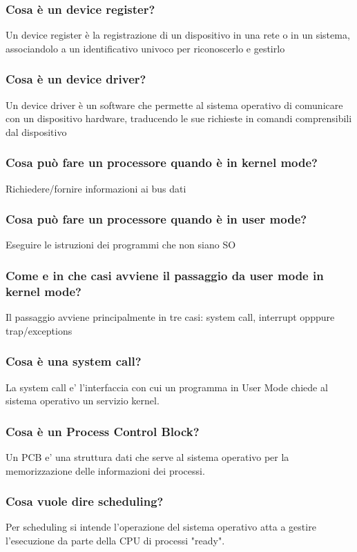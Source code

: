 \documentclass{article}
\begin{document}
\subsubsection{Cosa è un device register?}
Un device register è la registrazione di un dispositivo in una rete o in un
sistema, associandolo a un identificativo univoco per riconoscerlo e gestirlo
\subsubsection{Cosa è un device driver?}
Un device driver è un software che permette al sistema operativo di comunicare
con un dispositivo hardware, traducendo le sue richieste in comandi
comprensibili dal dispositivo
\subsubsection{Cosa può fare un processore quando è in kernel mode?}
Richiedere/fornire informazioni ai bus dati
\subsubsection{Cosa può fare un processore quando è in user mode?}
Eseguire le istruzioni dei programmi che non siano SO
\subsubsection{Come e in che casi avviene il passaggio da user mode in kernel mode?}
Il passaggio avviene principalmente in tre casi: system call, interrupt opppure
trap/exceptions
\subsubsection{Cosa è una system call?}
La system call e' l'interfaccia con cui un programma in User Mode chiede al
sistema operativo un servizio kernel.
\subsubsection{Cosa è un Process Control Block?}
Un PCB e' una struttura dati che serve al sistema operativo per la
memorizzazione delle informazioni dei processi.
\subsubsection{Cosa vuole dire scheduling?}
Per scheduling si intende l'operazione del sistema operativo atta a gestire
l'esecuzione da parte della CPU di processi "ready".
\end{document}
